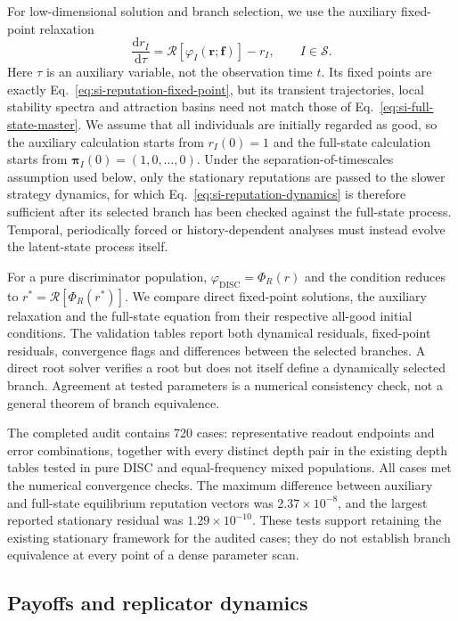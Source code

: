 \documentclass[fleqn,10pt]{wlscirep}
\begin{document}
For low-dimensional solution and branch selection, we use the auxiliary fixed-point relaxation
\begin{equation}
\frac{\mathrm dr_I}{\mathrm d\tau}
=\mathcal R[\varphi_I(\boldsymbol r;\boldsymbol f)]-r_I,
\qquad I\in\mathcal S.
\label{eq:si-reputation-dynamics}
\end{equation}
Here $\tau$ is an auxiliary variable, not the observation time $t$. Its fixed points are exactly Eq.~\eqref{eq:si-reputation-fixed-point}, but its transient trajectories, local stability spectra and attraction basins need not match those of Eq.~\eqref{eq:si-full-state-master}. We assume that all individuals are initially regarded as good, so the auxiliary calculation starts from $r_I(0)=1$ and the full-state calculation starts from $\boldsymbol\pi_I(0)=(1,0,\ldots,0)$. Under the separation-of-timescales assumption used below, only the stationary reputations are passed to the slower strategy dynamics, for which Eq.~\eqref{eq:si-reputation-dynamics} is therefore sufficient after its selected branch has been checked against the full-state process. Temporal, periodically forced or history-dependent analyses must instead evolve the latent-state process itself.

For a pure discriminator population, $\varphi_{\mathrm{DISC}}=\Phi_R(r)$ and the condition reduces to $r^*=\mathcal R[\Phi_R(r^*)]$. We compare direct fixed-point solutions, the auxiliary relaxation and the full-state equation from their respective all-good initial conditions. The validation tables report both dynamical residuals, fixed-point residuals, convergence flags and differences between the selected branches. A direct root solver verifies a root but does not itself define a dynamically selected branch. Agreement at tested parameters is a numerical consistency check, not a general theorem of branch equivalence.

The completed audit contains 720 cases: representative readout endpoints and error combinations, together with every distinct depth pair in the existing depth tables tested in pure DISC and equal-frequency mixed populations. All cases met the numerical convergence checks. The maximum difference between auxiliary and full-state equilibrium reputation vectors was $2.37\times10^{-8}$, and the largest reported stationary residual was $1.29\times10^{-10}$. These tests support retaining the existing stationary framework for the audited cases; they do not establish branch equivalence at every point of a dense parameter scan.
\subsection{Payoffs and replicator dynamics}
\label{sec:si-evolution}
\end{document}
